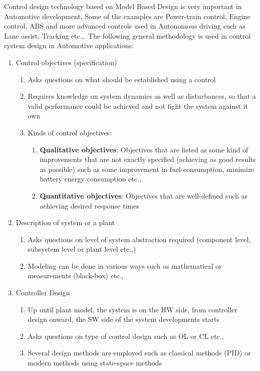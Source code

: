 Control design technology based on Model Based Design is very important in Automotive development. Some of the examples are Power-train control, Engine control, ABS and more advanced controls used in Autonomous driving such as Lane assist, Tracking etc.,. The following general methodology is used in control system design in Automotive applications:
\begin{enumerate}
	\item Control objectives (specification)
	\begin{enumerate}
		\item Asks questions on what should be established using a control
		\item Requires knowledge on system dynamics as well as disturbances, so that a valid performance could be achieved and not fight the system against it own
		\item Kinds of control objectives:
		\begin{enumerate}
			\item \textbf{Qualitative objectives}: Objectives that are listed as some kind of improvements that are not exactly specified (achieving as good results as possible) such as some improvement in fuel-consumption, minimize battery energy consumption etc.,
			\item \textbf{Quantitative objectives}: Objectives that are well-defined such as achieving desired response times
		\end{enumerate}
	\end{enumerate}
	\item Description of system or a plant
	\begin{enumerate}
		\item Asks questions on level of system abstraction required (component level, subsystem level or plant level etc.,)
		\item Modeling can be done in various ways such as mathematical or measurements (black-box) etc.,
	\end{enumerate}
	\item Controller Design
	\begin{enumerate}
		\item Up until plant model, the system is on the HW side, from controller design onward, the SW side of the system developments starts
		\item Asks questions on type of control design such as OL or CL etc.,
		\item Several design methods are employed such as classical methods (PID) or modern methods using state-space methods

\end{enumerate}
\end{enumerate}
